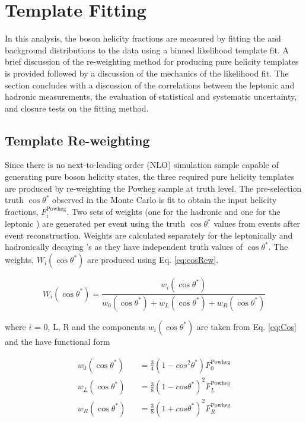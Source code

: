 \section{Template Fitting}
\label{sec:templateFitting}
In this analysis, the \w boson helicity fractions are measured by fitting the \ttbar and background distributions to the data  using a binned likelihood template fit. A brief discussion of the re-weighting method for producing pure helicity templates is provided followed by a discussion of the mechanics of the likelihood fit. The section concludes with a discussion of the correlations between the leptonic and hadronic measurements, the evaluation of statistical and systematic uncertainty, and closure tests on the fitting method.

\subsection{Template Re-weighting} 
Since there is no next-to-leading order (NLO) simulation \ttbar sample capable of generating pure \w boson helicity states, the three required pure helicity templates are produced by re-weighting the Powheg \ttbar sample at truth level. The pre-selection truth $\cos\theta^{*}$ observed in the Monte Carlo is fit to obtain the input helicity fractions, $F_i^{\text{Powheg}}$. Two sets of weights (one for the hadronic \w and one for the leptonic \w) are generated per event using the truth $\cos\theta^*$ values from \ttbar events after event reconstruction. Weights are calculated separately for the leptonically and hadronically decaying \w's as they have independent truth values of $\cos\theta^*$. The weights, $W_i(\cos\theta^*)$ are produced using Eq. \ref{eq:cosRew}.

\begin{equation}
  W_i(\cos\theta^*) = \frac{w_i(\cos\theta^*)}{w_0(\cos\theta^*)+w_L(\cos\theta^*)+w_R(\cos\theta^*)}
\label{eq:cosRew}
\end{equation}

where $i$ = 0, L, R and the components $w_i(\cos\theta^*)$ are taken from Eq. \ref{eq:Cos} and the have functional form 

\begin{eqnarray}
  w_0(\cos\theta^*) && = \frac{3}{4}(1-cos^2\theta^*)F_0^{\text{Powheg}}\\
  w_L(\cos\theta^*) && = \frac{3}{8}(1-cos\theta^*)^2F_L^{\text{Powheg}}\\
  w_R(\cos\theta^*) && = \frac{3}{8}(1+cos\theta^*)^2F_R^{\text{Powheg}}
\label{eq:cosRew_parts}
\end{eqnarray}

